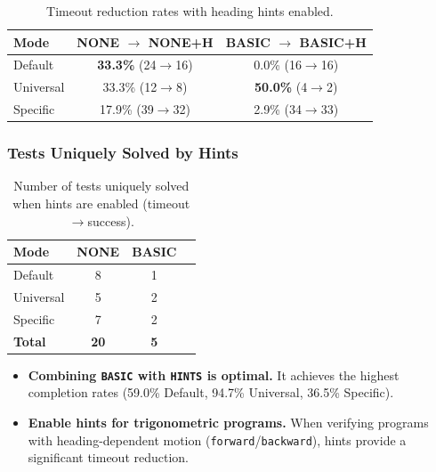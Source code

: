 \begin{table}[H]
\centering
\caption{Timeout reduction rates with heading hints enabled.}
\label{tab:hint-reduction}
\begin{tabular}{lcc}
\toprule
\textbf{Mode} & \textbf{NONE $\rightarrow$ NONE+H} & \textbf{BASIC $\rightarrow$ BASIC+H} \\
\midrule
Default   & \textbf{33.3\%} (24$\rightarrow$16) & 0.0\% (16$\rightarrow$16) \\
Universal & 33.3\% (12$\rightarrow$8) & \textbf{50.0\%} (4$\rightarrow$2) \\
Specific  & 17.9\% (39$\rightarrow$32) & 2.9\% (34$\rightarrow$33) \\
\bottomrule
\end{tabular}
\end{table}

\subsubsection*{Tests Uniquely Solved by Hints}

\begin{table}[H]
\centering
\caption{Number of tests uniquely solved when hints are enabled (timeout$\rightarrow$success).}
\label{tab:hint-unique}
\begin{tabular}{lccc}
\toprule
\textbf{Mode} & \textbf{NONE} & \textbf{BASIC}\\
\midrule
Default   &  8 & 1 \\
Universal &  5 & 2 \\
Specific  &  7 & 2 \\
\midrule
\textbf{Total} & \textbf{20} & \textbf{5} \\
\bottomrule
\end{tabular}
\end{table}


\begin{itemize}[leftmargin=1.5em, nosep]
    \item \textbf{Combining \texttt{BASIC} with \texttt{HINTS} is optimal.} It achieves the highest completion rates (59.0\% Default, 94.7\% Universal, 36.5\% Specific).
    \item \textbf{Enable hints for trigonometric programs.} When verifying programs with heading-dependent motion (\texttt{forward}/\texttt{backward}), hints provide a significant timeout reduction.
\end{itemize}


